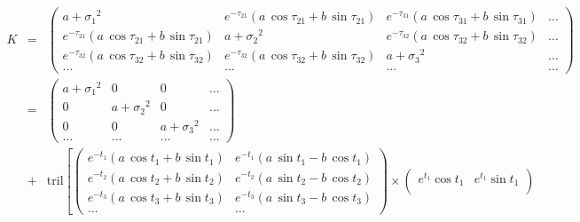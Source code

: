\documentclass[manuscript, letterpaper]{aastex6}
\newcommand{\eqlabel}[1]{\label{eq:#1}}
\begin{document}
\begin{eqnarray}\eqlabel{semi-separable-structure}
K&=&%
\begin{pmatrix}
    {\scriptscriptstyle a+{\sigma_1}^2 }& {\scriptscriptstyle e^{-\tau_{21}}\left(a\,\cos{\tau_{21}}+b\,\sin{\tau_{21}}\right)} & {\scriptscriptstyle e^{-\tau_{31}}\left(a\,\cos{\tau_{31}}+b\,\sin{\tau_{31}}\right)} & \ldots\\
    {\scriptscriptstyle e^{-\tau_{21}}\left(a\,\cos{\tau_{21}}+b\,\sin{\tau_{21}}\right)}&{\scriptscriptstyle a+{\sigma_2}^2 }& {\scriptscriptstyle e^{-\tau_{32}}\left(a\,\cos{\tau_{32}}+b\,\sin{\tau_{32}}\right)} & \ldots\\
    {\scriptscriptstyle e^{-\tau_{32}}\left(a\,\cos{\tau_{32}}+b\,\sin{\tau_{32}}\right)}&{\scriptscriptstyle  e^{-\tau_{32}}\left(a\,\cos{\tau_{32}}+b\,\sin{\tau_{32}}\right)} & \scriptscriptstyle{a + {\sigma_3}^2} & \ldots \\
    \ldots & \ldots & \ldots & \ldots
\end{pmatrix}\\
&=&
\begin{pmatrix}
    {\scriptscriptstyle a+{\sigma_1}^2} & {\scriptscriptstyle 0} & {\scriptscriptstyle 0} & \ldots\\
    {\scriptscriptstyle 0} & {\scriptscriptstyle a+{\sigma_2}^2 }& {\scriptscriptstyle 0} & \ldots\\
    {\scriptscriptstyle 0} & {\scriptscriptstyle 0} & {\scriptscriptstyle a + {\sigma_3}^2} & \ldots\\
    \ldots & \ldots & \ldots & \ldots
\end{pmatrix}\\
&+&\mathrm{tril}\left[\begin{pmatrix}
    {\scriptscriptstyle e^{-t_1}\left(a\,\cos{t_1}+b\,\sin{t_1}\right)}&
    {\scriptscriptstyle e^{-t_1}\left(a\,\sin{t_1}-b\,\cos{t_1}\right)}\\
    {\scriptscriptstyle e^{-t_2}\left(a\,\cos{t_2}+b\,\sin{t_2}\right)}&
    {\scriptscriptstyle e^{-t_2}\left(a\,\sin{t_2}-b\,\cos{t_2}\right)}\\
    {\scriptscriptstyle e^{-t_3}\left(a\,\cos{t_3}+b\,\sin{t_3}\right)}&
    {\scriptscriptstyle e^{-t_3}\left(a\,\sin{t_3}-b\,\cos{t_3}\right)}\\
   \ldots & \ldots
\end{pmatrix}
\times
\begin{pmatrix}
 {\scriptscriptstyle e^{t_1} \cos{t_1}} & {\scriptscriptstyle e^{t_1} \sin{t_1}} \\

\end{pmatrix}
\end{eqnarray}
\end{document}
